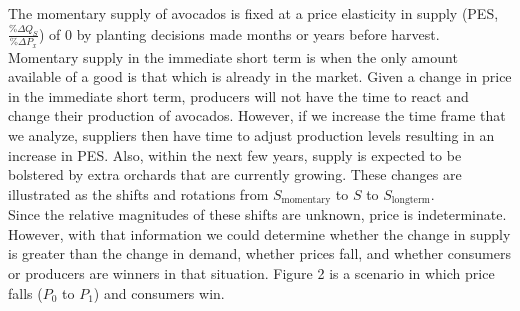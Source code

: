 \documentclass[12pt]{article}
\begin{document}
	The momentary supply of avocados is fixed at a price elasticity in supply (PES, ${\frac{\% \Delta Q_S}{\% \Delta P_x}}$) of 0 by planting decisions made months or years before harvest. Momentary supply in the immediate short term is when the only amount available of a good is that which is already in the market. Given a change in price in the immediate short term, producers will not have the time to react and change their production of avocados. However, if we increase the time frame that we analyze, suppliers then have time to adjust production levels resulting in an increase in PES. Also, within the next few years, supply is expected to be bolstered by extra orchards that are currently growing. These changes are illustrated as the shifts and rotations from $S_\textrm{momentary}$ to $S$ to $S_\textrm{longterm}$. \\
	
	Since the relative magnitudes of these shifts are unknown, price is indeterminate. However, with that information we could determine whether the change in supply is greater than the change in demand, whether prices fall, and whether consumers or producers are winners in that situation. Figure 2 is a scenario in which price falls ($P_0$ to $P_1$) and consumers win.
\end{document}
